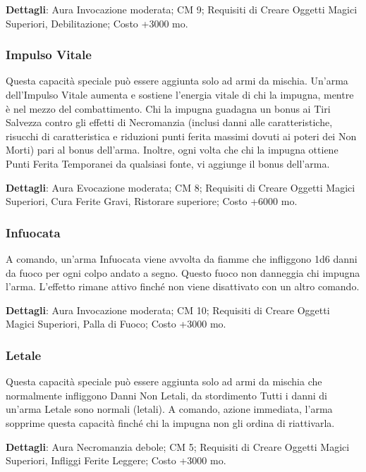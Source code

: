\begin{multicols}{2}
\textbf{Dettagli}: Aura Invocazione moderata; CM 9; Requisiti di Creare Oggetti Magici Superiori, Debilitazione; Costo +3000 mo.

\subsubsection{Impulso Vitale}

Questa capacità speciale può essere aggiunta solo ad armi da mischia. Un'arma dell'Impulso Vitale aumenta e sostiene l'energia vitale di chi la impugna, mentre è nel mezzo del combattimento. Chi la impugna guadagna un bonus ai Tiri Salvezza contro gli effetti di Necromanzia (inclusi danni alle caratteristiche, risucchi di caratteristica e riduzioni punti ferita massimi dovuti ai poteri dei Non Morti) pari al bonus dell'arma. Inoltre, ogni volta che chi la impugna ottiene Punti Ferita Temporanei da qualsiasi fonte, vi aggiunge il bonus dell'arma.

\textbf{Dettagli}: Aura Evocazione moderata; CM 8; Requisiti di Creare Oggetti Magici Superiori, Cura Ferite Gravi, Ristorare superiore; Costo +6000 mo.

\subsubsection{Infuocata}

A comando, un'arma Infuocata viene avvolta da fiamme che infliggono 1d6 danni da fuoco per ogni colpo andato a segno. Questo fuoco non danneggia chi impugna l'arma. L'effetto rimane attivo finché non viene disattivato con un altro comando.

\textbf{Dettagli}: Aura Invocazione moderata; CM 10; Requisiti di Creare Oggetti Magici Superiori, Palla di Fuoco; Costo +3000 mo.

\subsubsection{Letale}

Questa capacità speciale può essere aggiunta solo ad armi da mischia che normalmente infliggono Danni Non Letali, da stordimento Tutti i danni di un'arma Letale sono normali (letali). A comando, azione immediata, l'arma sopprime questa capacità finché chi la impugna non gli ordina di riattivarla.

\textbf{Dettagli}: Aura Necromanzia debole; CM 5; Requisiti di Creare Oggetti Magici Superiori, Infliggi Ferite Leggere; Costo +3000 mo.


\end{multicols}
